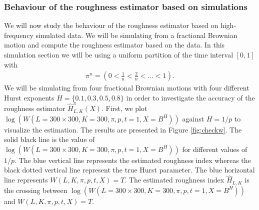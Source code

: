 \documentclass{article}
\begin{document}
\subsubsection{Behaviour of the roughness estimator based on simulations}
We will now study the behaviour of the roughness estimator based on high-frequency simulated data. We will be simulating from a fractional Brownian motion and compute the roughness estimator based on the data. In this simulation section we will be using a uniform partition of the time interval $[0,1]$ with
\begin{align*}
\pi^n = \left( 0 < \frac{1}{n}< \frac{2}{n}<...< 1\right).
\end{align*}
We will be simulating from four fractional Brownian motions with four different Hurst exponents $H=\{0.1,0.3,0.5,0.8\}$ in order to investigate the accuracy of the roughness estimator $\hat{H}^\pi_{L,K}(X)$. First, we plot $\log(W(L=300\times 300, K=300, \pi, p, t=1, X=B^H))$ against $H=1/p$ to visualize the estimation. The results are presented in Figure \ref{fig:checkw}. The solid black line is the value of $\log(W(L=300\times 300, K=300, \pi, p, t=1, X=B^H))$ for different values of $1/p$. The blue vertical line represents the estimated roughness index whereas the black dotted vertical line represent the true Hurst parameter. The blue horizontal line represents $W(L, K, \pi, p, t, X) = T$. The estimated roughness index $\hat{H}_{L,K}$ is the crossing between $\log(W(L=300\times 300, K=300, \pi, p, t=1, X=B^H))$ and $W(L, K, \pi, p, t, X) = T$. \\\\
\end{document}
